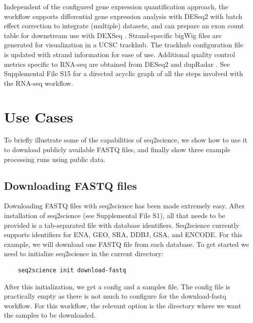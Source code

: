 Independent of the configured gene expression quantification approach, the workflow supports differential gene expression analysis with DESeq2 \cite{deseq2} with batch effect correction to integrate (multiple) datasets, and can prepare an exon count table for downstream use with DEXSeq \cite{dexseq}. Strand-specific bigWig files are generated for visualization in a UCSC trackhub. The trackhub configuration file is updated with strand information for ease of use. Additional quality control metrics specific to RNA-seq are obtained from DESeq2 \cite{deseq2} and dupRadar \cite{dupradar}. See Supplemental File S15 for a directed acyclic graph of all the steps involved with the RNA-seq workflow.

\section{Use Cases} %

To briefly illustrate some of the capabilities of seq2science, we show how to use it to download publicly available FASTQ files, and finally show three example processing runs using public data.

\subsection{Downloading FASTQ files}

Downloading FASTQ files with seq2science has been made extremely easy. After installation of seq2science (see Supplemental File S1), all that needs to be provided is a tab-separated file with database identifiers. Seq2science currently supports identifiers for ENA, GEO, SRA, DDBJ, GSA, and ENCODE. For this example, we will download one FASTQ file from each database. To get started we need to initialize seq2science in the current directory:

\begin{verbatim}
    seq2science init download-fastq
\end{verbatim}

After this initialization, we get a config and a samples file. The config file is practically empty as there is not much to configure for the download-fastq workflow. For this workflow, the relevant option is the directory where we want the samples to be downloaded.

